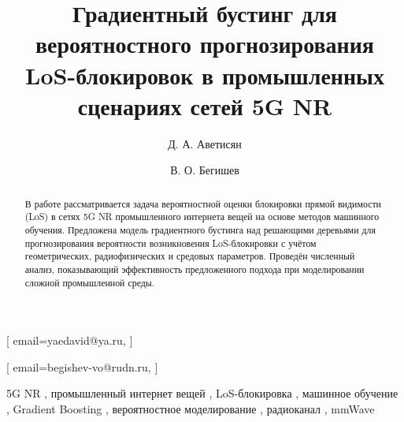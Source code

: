 \documentclass[%
]{ittmm}
\begin{document}


\title{Градиентный бустинг для вероятностного прогнозирования LoS-блокировок в промышленных сценариях сетей 5G NR}


\author{Д. А. Аветисян}[%
email=yaedavid@ya.ru,
]
\cormark[1]

\author{В. О. Бегишев}[%
email=begishev-vo@rudn.ru,
]


\begin{abstract}
    В работе рассматривается задача вероятностной оценки блокировки прямой видимости (LoS) в сетях 5G NR промышленного интернета вещей на основе методов машинного обучения. 
    Предложена модель градиентного бустинга над решающими деревьями для прогнозирования вероятности возникновения LoS-блокировки с учётом геометрических, радиофизических и средовых параметров. 
    Проведён численный анализ, показывающий эффективность предложенного подхода при моделировании сложной промышленной среды.
\end{abstract}

\begin{keywords}
  5G NR \sep
  промышленный интернет вещей \sep
  LoS-блокировка \sep
  машинное обучение \sep
  Gradient Boosting \sep
  вероятностное моделирование \sep
  радиоканал \sep
  mmWave
\end{keywords}
\end{document}
